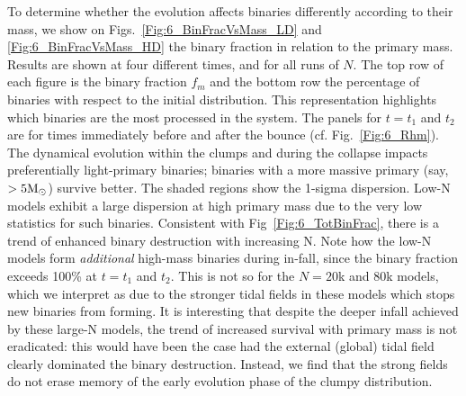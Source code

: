 To determine whether the evolution affects binaries differently according to their mass, we show on Figs.~\ref{Fig:6_BinFracVsMass_LD} and \ref{Fig:6_BinFracVsMass_HD} the binary fraction in relation to the primary mass. Results are shown at four different times, and for all runs of $N$. The top row of each figure is the binary fraction $f_m$ and the bottom row the percentage of binaries with respect to the initial distribution. 
This representation highlights which binaries are the most processed in the system. The panels for $t = t_1$ and $t_2$ are for times immediately before and after the bounce (cf. Fig.~\ref{Fig:6_Rhm}). The dynamical evolution within the clumps and during the collapse impacts preferentially light-primary binaries; binaries with a more massive primary (say, $> 5 {\textrm{M}_\odot}$) survive better. The shaded regions show
 the 1-sigma dispersion. Low-N models exhibit a large dispersion at high primary mass due to the very low statistics for such binaries. Consistent with Fig~\ref{Fig:6_TotBinFrac}, there is a trend of enhanced binary destruction with increasing N. Note how the low-N models form {\it additional} high-mass binaries during in-fall, since the binary fraction exceeds 100\% at $t = t_1 $ and $t_2$. This is not so for the $N = 20$k and $80$k models, which we interpret as due to the stronger tidal fields in these models which stops new binaries from forming. It is interesting that despite the deeper infall achieved by  these large-N models, the trend of increased survival with primary mass is not eradicated: this would have been the case had the external (global) tidal field clearly dominated the binary destruction. Instead, we find that the strong fields do not erase memory of the early evolution phase of the clumpy distribution. 


